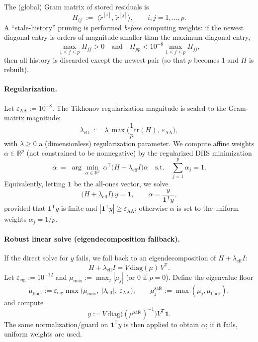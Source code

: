 The (global) Gram matrix of stored residuals is
\begin{equation}\label{eq:aa-gram}
H_{ij} \;:=\; \langle \widetilde{r}^{[i]},\,\widetilde{r}^{[j]} \rangle, \qquad i,j=1,\dots,p.
\end{equation}
A ``stale-history'' pruning is performed \emph{before} computing weights: if the newest diagonal entry is orders of magnitude smaller than the maximum diagonal entry,
\[
\max_{1\le j\le p} H_{jj} > 0\quad \text{and}\quad H_{pp} < 10^{-8}\max_{1\le j\le p} H_{jj},
\]
then all history is discarded except the newest pair (so that $p$ becomes $1$ and $H$ is rebuilt).

\paragraph{Regularization.}
Let $\varepsilon_{\mathrm{AA}}:=10^{-8}$. The Tikhonov regularization magnitude is scaled to the Gram-matrix magnitude:
\begin{equation}\label{eq:aa-reg}
\lambda_{\mathrm{eff}} \;:=\; \lambda\,\max\!\Big(\frac{1}{p}\mathrm{tr}(H),\ \varepsilon_{\mathrm{AA}}\Big),
\end{equation}
with $\lambda\ge 0$ a (dimensionless) regularization parameter. We compute affine weights $\alpha\in\mathbb{R}^p$ (not constrained to be nonnegative) by the regularized DIIS minimization
\begin{equation}\label{eq:aa-weights}
\alpha \;=\; \arg\min_{\alpha\in\mathbb{R}^p}\ \alpha^{\mathsf{T}}\!\big(H+\lambda_{\mathrm{eff}}I\big)\alpha
\quad\text{s.t.}\quad \sum_{j=1}^p \alpha_j = 1.
\end{equation}
Equivalently, letting $\mathbf{1}$ be the all-ones vector, we solve
\[
\big(H+\lambda_{\mathrm{eff}}I\big)\,y=\mathbf{1},
\qquad \alpha = \frac{y}{\mathbf{1}^{\mathsf{T}}y},
\]
provided that $\mathbf{1}^{\mathsf{T}}y$ is finite and $|\mathbf{1}^{\mathsf{T}}y|\ge \varepsilon_{\mathrm{AA}}$; otherwise $\alpha$ is set to the uniform weights $\alpha_j=1/p$.

\paragraph{Robust linear solve (eigendecomposition fallback).}
If the direct solve for $y$ fails, we fall back to an eigendecomposition of $H+\lambda_{\mathrm{eff}}I$:
\[
H+\lambda_{\mathrm{eff}}I = V\,\mathrm{diag}(\mu)\,V^{\mathsf{T}}.
\]
Let $\varepsilon_{\mathrm{eig}}:=10^{-12}$ and $\mu_{\max}:=\max_j|\mu_j|$ (or $0$ if $p=0$).
Define the eigenvalue floor
\[
\mu_{\mathrm{floor}} := \varepsilon_{\mathrm{eig}}\max\!\big(\mu_{\max},\ |\lambda_{\mathrm{eff}}|,\ \varepsilon_{\mathrm{AA}}\big),
\qquad 
\mu_j^{\mathrm{safe}} := \max(\mu_j,\mu_{\mathrm{floor}}),
\]
and compute
\[
y := V\,\mathrm{diag}\big((\mu^{\mathrm{safe}})^{-1}\big)V^{\mathsf{T}}\mathbf{1}.
\]
The same normalization/guard on $\mathbf{1}^{\mathsf{T}}y$ is then applied to obtain $\alpha$; if it fails, uniform weights are used.

